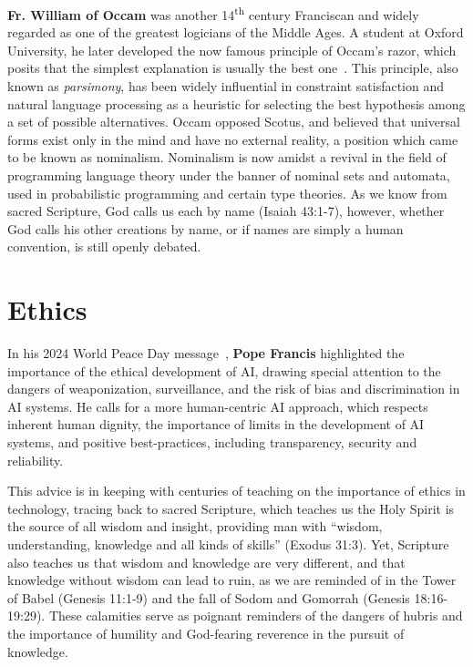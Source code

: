 \documentclass[sigplan,nonacm]{acmart}\settopmatter{printfolios=false,printccs=false,printacmref=false}
\begin{document}
  \textbf{Fr. William of Occam} was another 14\textsuperscript{th} century Franciscan and widely regarded as one of the greatest logicians of the Middle Ages. A student at Oxford University, he later developed the now famous principle of Occam's razor, which posits that the simplest explanation is usually the best one~\cite{occam1495quaestiones}. This principle, also known as \textit{parsimony}, has been widely influential in constraint satisfaction and natural language processing as a heuristic for selecting the best hypothesis among a set of possible alternatives. Occam opposed Scotus, and believed that universal forms exist only in the mind and have no external reality, a position which came to be known as nominalism. Nominalism is now amidst a revival in the field of programming language theory under the banner of nominal sets and automata, used in probabilistic programming and certain type theories. As we know from sacred Scripture, God calls us each by name (Isaiah 43:1-7), however, whether God calls his other creations by name, or if names are simply a human convention, is still openly debated.

  \section{Ethics}

  In his 2024 World Peace Day message~\cite{catholic2024message}, \textbf{Pope Francis} highlighted the importance of the ethical development of AI, drawing special attention to the dangers of weaponization, surveillance, and the risk of bias and discrimination in AI systems. He calls for a more human-centric AI approach, which respects inherent human dignity, the importance of limits in the development of AI systems, and positive best-practices, including transparency, security and reliability.

  This advice is in keeping with centuries of teaching on the importance of ethics in technology, tracing back to sacred Scripture, which teaches us the Holy Spirit is the source of all wisdom and insight, providing man with ``wisdom, understanding, knowledge and all kinds of skills'' (Exodus 31:3). Yet, Scripture also teaches us that wisdom and knowledge are very different, and that knowledge without wisdom can lead to ruin, as we are reminded of in the Tower of Babel (Genesis 11:1-9) and the fall of Sodom and Gomorrah (Genesis 18:16-19:29). These calamities serve as poignant reminders of the dangers of hubris and the importance of humility and God-fearing reverence in the pursuit of knowledge.
\end{document}
